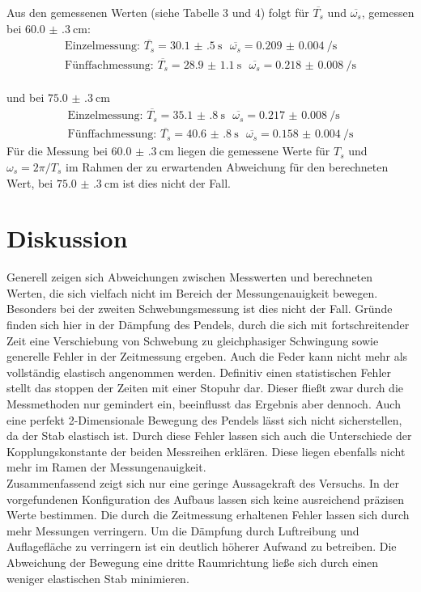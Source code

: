 Aus den gemessenen Werten (siehe Tabelle 3 und 4) folgt für $\overline{T_s}$ und $\overline{\omega_s}$, gemessen bei $\SI{60.0(3)}{\centi\metre}$:
\begin{equation*}
\begin{split}
 \text{Einzelmessung: }\overline{T_{s}} = \SI{30.1(5)}{\second} \ \ \ \overline{\omega_s}= \SI{0.209(4)}{\per\second}\\
 \text{Fünffachmessung: }\overline{T_{s}} = \SI{28.9(11)}{\second} \ \ \ \overline{\omega_s} = \SI{0.218(8)}{\per\second}
\end{split}
\end{equation*}
\\ und bei $\SI{75.0(3)}{\centi\metre}$
\begin{equation*}
\begin{split}
 \text{Einzelmessung: }\overline{T_{s}} = \SI{35.1(8)}{\second} \ \ \ \overline{\omega_s} = \SI{0.217(8)}{\per\second}\\
 \text{Fünffachmessung: }\overline{T_{s}} = \SI{40.6(8)}{\second} \ \ \ \overline{\omega_s} = \SI{0.158(4)}{\per\second}
\end{split}
\end{equation*}
Für die Messung bei $\SI{60.0(3)}{\centi\metre}$ liegen die gemessene Werte für $T_s$ und $ \omega_s = 2\pi/T_s$ im Rahmen der zu erwartenden Abweichung für den berechneten Wert,
bei $\SI{75.0(3)}{\centi\metre}$ ist dies nicht der Fall.
\section{Diskussion}
Generell zeigen sich Abweichungen zwischen Messwerten und berechneten Werten, die sich vielfach nicht im Bereich der Messungenauigkeit bewegen.
Besonders bei der zweiten Schwebungsmessung ist dies nicht der Fall. Gründe finden sich hier in der Dämpfung des Pendels, durch die sich mit fortschreitender Zeit eine
Verschiebung von Schwebung zu gleichphasiger Schwingung sowie generelle Fehler in der Zeitmessung ergeben. Auch die Feder kann nicht mehr als vollständig elastisch
angenommen werden. Definitiv einen statistischen Fehler stellt das stoppen der Zeiten mit einer Stopuhr dar. Dieser fließt zwar durch die Messmethoden nur gemindert ein,
beeinflusst das Ergebnis aber dennoch. Auch eine perfekt 2-Dimensionale Bewegung des Pendels lässt sich nicht sicherstellen, da der Stab elastisch ist.
Durch diese Fehler lassen sich auch die Unterschiede der Kopplungskonstante der beiden Messreihen erklären. Diese liegen ebenfalls nicht mehr im Ramen der Messungenauigkeit.
\\
Zusammenfassend zeigt sich nur eine geringe Aussagekraft des Versuchs. In der vorgefundenen Konfiguration des Aufbaus lassen sich keine ausreichend präzisen Werte bestimmen.
Die durch die Zeitmessung erhaltenen Fehler lassen sich durch mehr Messungen verringern. Um die Dämpfung durch Luftreibung und Auflagefläche zu verringern ist ein deutlich höherer
Aufwand zu betreiben. Die Abweichung der Bewegung eine dritte Raumrichtung ließe sich durch einen weniger elastischen Stab minimieren.

\newpage
\nocite{*}
\printbibliography
